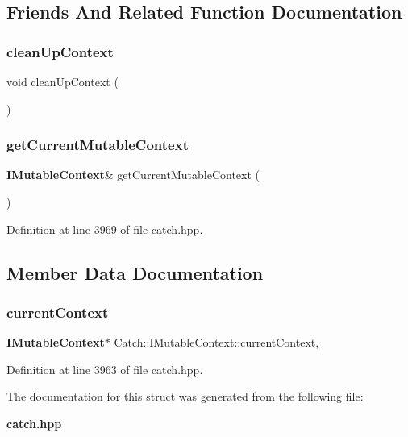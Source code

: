 \subsection{Friends And Related Function Documentation}
\mbox{\label{struct_catch_1_1_i_mutable_context_ac07cdb7d744cc8f09672d924324b55fd}} 
\subsubsection{cleanUpContext}
{\footnotesize\ttfamily void clean\+Up\+Context (\begin{DoxyParamCaption}{ }\end{DoxyParamCaption})\hspace{0.3cm}{\ttfamily [friend]}}

\mbox{\label{struct_catch_1_1_i_mutable_context_aea4b25692aaf4397cdf630716976f6b8}} 
\subsubsection{getCurrentMutableContext}
{\footnotesize\ttfamily \textbf{ I\+Mutable\+Context}\& get\+Current\+Mutable\+Context (\begin{DoxyParamCaption}{ }\end{DoxyParamCaption})\hspace{0.3cm}{\ttfamily [friend]}}



Definition at line 3969 of file catch.\+hpp.



\subsection{Member Data Documentation}
\mbox{\label{struct_catch_1_1_i_mutable_context_aca4de034d0deed74dba34f143e4e273e}} 
\subsubsection{currentContext}
{\footnotesize\ttfamily \textbf{ I\+Mutable\+Context}$\ast$ Catch\+::\+I\+Mutable\+Context\+::current\+Context\hspace{0.3cm}{\ttfamily [static]}, {\ttfamily [private]}}



Definition at line 3963 of file catch.\+hpp.



The documentation for this struct was generated from the following file\+:\begin{DoxyCompactItemize}
\item 
\textbf{ catch.\+hpp}\end{DoxyCompactItemize}
